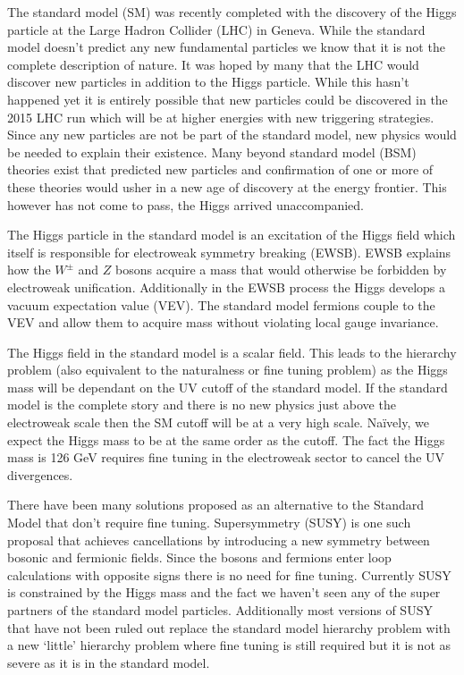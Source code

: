 
The standard model (SM) was recently completed with the discovery of the Higgs particle at the Large Hadron Collider (LHC) in Geneva.
While the standard model doesn't predict any new fundamental particles we know that it is not the complete description of nature.
It was hoped by many that the LHC would discover new particles in addition to the Higgs particle.
While this hasn't happened yet it is entirely possible that new particles could be discovered in the 2015 LHC run which will be at higher energies with new triggering strategies.
Since any new particles are not be part of the standard model, new physics would be needed to explain their existence.
Many beyond standard model (BSM) theories exist that predicted new particles and confirmation of one or more of these theories would usher in a new age of discovery at the energy frontier. 
This however has not come to pass, the Higgs arrived unaccompanied.

The Higgs particle in the standard model is an excitation of the Higgs field which itself is responsible for electroweak symmetry breaking (EWSB).
EWSB explains how the $W^{\pm}$ and $Z$ bosons acquire a mass that would otherwise be forbidden by electroweak unification.
Additionally in the EWSB process the Higgs develops a vacuum expectation value (VEV).
The standard model fermions couple to the VEV and allow them to acquire mass without violating local gauge invariance.

The Higgs field in the standard model is a scalar field.
This leads to the hierarchy problem (also equivalent to the naturalness or fine tuning problem) as the Higgs mass will be dependant on the UV cutoff of the standard model.
If the standard model is the complete story and there is no new physics just above the electroweak scale then the SM cutoff will be at a very high scale.
Naïvely, we expect the Higgs mass to be at the same order as the cutoff.
The fact the Higgs mass is 126 GeV requires fine tuning in the electroweak sector to cancel the UV divergences.

There have been many solutions proposed as an alternative to the Standard Model that don't require fine tuning.
Supersymmetry (SUSY) is one such proposal that achieves cancellations by introducing a new symmetry between bosonic and fermionic fields.
Since the bosons and fermions enter loop calculations with opposite signs there is no need for fine tuning.
Currently SUSY is constrained by the Higgs mass and the fact we haven't seen any of the super partners of the standard model particles.
Additionally most versions of SUSY that have not been ruled out replace the standard model hierarchy problem with a new  `little' hierarchy problem where fine tuning is still required but it is not as severe as it is in the standard model.

